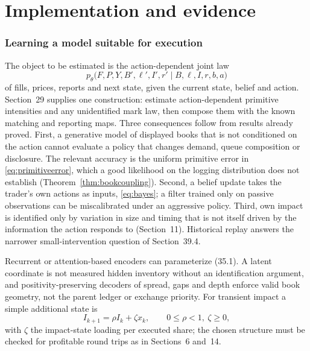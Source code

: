 \documentclass[11pt]{article}
\numberwithin{equation}{section}
\theoremstyle{definition}
\theoremstyle{remark}
\theoremstyle{definition}
\begin{document}




\clearpage
\part{Implementation and evidence}\label{pt:impl}
\section{Learning a model suitable for execution}\label{sec:learning}
The object to be estimated is the action-dependent joint law
\begin{equation}
  p_\theta\bigl(F,P,Y,B',\ell',I',r'\mid B,\ell,I,r,b,a\bigr) \label{eq:jointlearn}
\end{equation}
of fills, prices, reports and next state, given the current state, belief and
action. Section~29 supplies one construction: estimate action-dependent
primitive intensities and any unidentified mark law, then compose them with
the known matching and reporting maps. Three consequences follow from results
already proved. First, a generative model of displayed books that is not
conditioned on the action cannot evaluate a policy that changes demand, queue
composition or disclosure. The relevant accuracy is the uniform primitive
error in \eqref{eq:primitiveerror}, which a good likelihood on the logging distribution does not
establish (Theorem~\ref{thm:bookcoupling}). Second, a belief update takes the
trader's own actions as inputs, \eqref{eq:bayes}; a filter trained only on passive
observations can be miscalibrated under an aggressive policy. Third, own impact
is identified only by variation in size and timing that is not itself driven by
the information the action responds to (Section~11). Historical replay answers
the narrower small-intervention question of Section~39.4.

Recurrent or attention-based encoders can parameterize (35.1). A latent
coordinate is not measured hidden inventory without an identification
argument, and positivity-preserving decoders of spread, gaps and depth enforce
valid book geometry, not the parent ledger or exchange priority. For transient
impact a simple additional state is
\begin{equation}
  I_{k+1}=\rho I_k+\zeta x_k,\qquad 0\le\rho<1,\ \zeta\ge0, \label{eq:impactstate}
\end{equation}
with $\zeta$ the impact-state loading per executed share; the chosen structure
must be checked for profitable round trips as in Sections~6 and~14.
\end{document}
